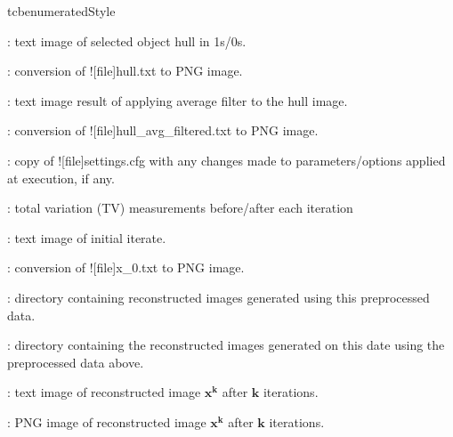 \begin{tcbenvironment}
\begin{tcbparbox}{tcbenumeratedStyle}
\begin{ThinEnum}
\begin{ThinEnum}
\begin{ThinEnum}
\begin{ThinEnum}
\begin{ThinEnum}
\begin{ThinEnum}
\begin{ThinEnum}
\begin{ThinEnum}
\begin{ThinEnum}
                                            \item {} : text image of selected object hull in 1s/0s.
                                            \item {} : conversion of \docentry![file]{hull.txt} to PNG image.
                                            \item {} : text image result of applying average filter to the hull image.
                            \item {} : conversion of \docentry![file]{hull\_avg\_filtered.txt} to PNG image.
                            \item {} : copy of \docentry![file]{settings.cfg} with any changes made to parameters/options applied at execution, if any.
                                            \item {} : total variation (TV) measurements before/after each iteration
                                            \item {} : text image of initial iterate.
                                        \item {} : conversion of \docentry![file]{x\_0.txt} to PNG image.
                                        \item {} : directory containing reconstructed images generated using this preprocessed data.
                                        \begin{ThinEnum}
                                            \item {} : directory containing the reconstructed images generated on this date using the preprocessed data above.
                                                \begin{ThinEnum}
                                                    \item {} : text image of reconstructed image $\boldsymbol{x^k}$ after $\boldsymbol{k}$ iterations.
                                                    \item {} : PNG image of reconstructed image $\boldsymbol{x^k}$ after $\boldsymbol{k}$ iterations.
                                                \end{ThinEnum}

\end{ThinEnum}
\end{ThinEnum}
\end{ThinEnum}
\end{ThinEnum}
\end{ThinEnum}
\end{ThinEnum}
\end{ThinEnum}
\end{ThinEnum}
\end{ThinEnum}
\end{ThinEnum}
\end{tcbparbox}
\end{tcbenvironment}
